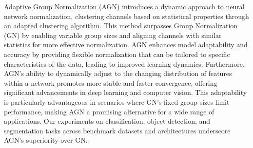 Adaptive Group Normalization (AGN) introduces a dynamic approach to neural network normalization, clustering channels based on statistical properties through an adapted clustering algorithm. This method surpasses Group Normalization (GN) by enabling variable group sizes and aligning channels with similar statistics for more effective normalization. AGN enhances model adaptability and accuracy by providing flexible normalization that can be tailored to specific characteristics of the data, leading to improved learning dynamics. Furthermore, AGN's ability to dynamically adjust to the changing distribution of features within a network promotes more stable and faster convergence, offering significant advancements in deep learning and computer vision. This adaptability is particularly advantageous in scenarios where GN's fixed group sizes limit performance, making AGN a promising alternative for a wide range of applications. Our experiments on classification, object detection, and segmentation tasks across benchmark datasets and architectures underscore AGN's superiority over GN.